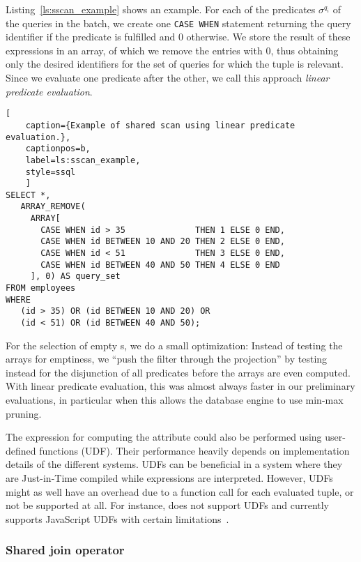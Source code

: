 Listing~\ref{ls:sscan_example} shows an example.
For each of the predicates $\sigma^{q_i}$ of the queries in the batch,
we create one \lstinline[style=sql]{CASE WHEN} statement
returning the query identifier if the predicate is fulfilled and 0 otherwise.
We store the result of these expressions in an array,
of which we remove the entries with 0,
thus obtaining only the desired identifiers
for the set of queries for which the tuple is relevant.
Since we evaluate one predicate after the other,
we call this approach \emph{linear predicate evaluation}.

\begin{lstlisting}[
    caption={Example of shared scan using linear predicate evaluation.},
    captionpos=b,
    label=ls:sscan_example,
    style=ssql
    ]
SELECT *,
   ARRAY_REMOVE(
     ARRAY[
       CASE WHEN id > 35              THEN 1 ELSE 0 END,
       CASE WHEN id BETWEEN 10 AND 20 THEN 2 ELSE 0 END,
       CASE WHEN id < 51              THEN 3 ELSE 0 END,
       CASE WHEN id BETWEEN 40 AND 50 THEN 4 ELSE 0 END
     ], 0) AS query_set
FROM employees
WHERE
   (id > 35) OR (id BETWEEN 10 AND 20) OR
   (id < 51) OR (id BETWEEN 40 AND 50);
\end{lstlisting}

For the selection of empty \qset{}s, we do a small optimization:
Instead of testing the arrays for emptiness,
we ``push the filter through the projection''
by testing instead for the disjunction of all predicates
before the arrays are even computed.
With linear predicate evaluation,
this was almost always faster in our preliminary evaluations,
in particular when this allows the database engine
to use min-max pruning.

The expression for computing the \qset attribute
could also be performed using user-defined functions (UDF).
Their performance heavily depends on implementation details
of the different systems.
UDFs can be beneficial in a system where they are Just-in-Time compiled
while expressions are interpreted.
However, UDFs might as well have an overhead
due to a function call for each evaluated tuple,
or not be supported at all.
For instance,
\athena does not support UDFs
and \bigquery currently supports JavaScript UDFs
with certain limitations~\cite{bq_udfs_limits}.


\subsubsection{Shared join operator}

